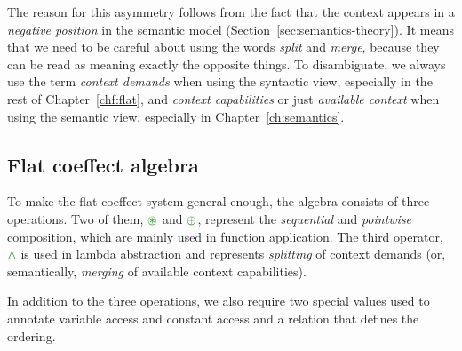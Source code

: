 The reason for this asymmetry follows from the fact that the context appears in a \emph{negative
position} in the semantic model (Section~\ref{sec:semantics-theory}). It means that we need to be
careful about using the words \emph{split} and \emph{merge}, because they can be read as meaning
exactly the opposite things. To disambiguate, we always use the term \emph{context demands}
when using the syntactic view, especially in the rest of Chapter~\ref{chf:flat}, and
\emph{context capabilities} or just \emph{available context} when using the semantic view,
especially in Chapter~\ref{ch:semantics}.


\subsection{Flat coeffect algebra}
\label{sec:flat-calculus-algebra}

To make the flat coeffect system general enough, the algebra consists of three operations.
Two of them, $\cseq$ and $\cpar$, represent the \emph{sequential} and \emph{pointwise} composition,
which are mainly used in function application. The third operator, $\czip$ is used in lambda
abstraction and represents \emph{splitting} of context demands (or, semantically, \emph{merging}
of available context capabilities).

In addition to the three operations, we also require two special values used to annotate
variable access and constant access and a relation that defines the ordering.

